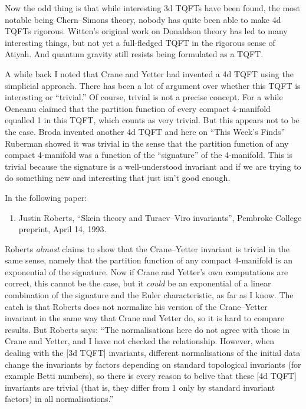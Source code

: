 \documentclass[12pt]{article}
\def\tightlist{}
\begin{document}
Now the odd thing is that while interesting 3d TQFTs have been found,
the most notable being Chern--Simons theory, nobody has quite been able
to make 4d TQFTs rigorous. Witten's original work on Donaldson theory
has led to many interesting things, but not yet a full-fledged TQFT in
the rigorous sense of Atiyah. And quantum gravity still resists being
formulated as a TQFT.

A while back I noted that Crane and Yetter had invented a 4d TQFT using
the simplicial approach. There has been a lot of argument over whether
this TQFT is interesting or ``trivial.'' Of course, trivial is not a
precise concept. For a while Ocneanu claimed that the partition function
of every compact 4-manifold equalled 1 in this TQFT, which counts as
very trivial. But this appears not to be the case. Broda invented
another 4d TQFT and here on ``This Week's Finds'' Ruberman showed it was
trivial in the sense that the partition function of any compact
4-manifold was a function of the ``signature'' of the 4-manifold. This
is trivial because the signature is a well-understood invariant and if
we are trying to do something new and interesting that just isn't good
enough.

In the following paper:

\begin{enumerate}
\def\labelenumi{\arabic{enumi})}
\tightlist
\item
   Justin Roberts, ``Skein theory and Turaev--Viro invariants'',
  Pembroke College preprint, April 14, 1993.
\end{enumerate}

Roberts \emph{almost} claims to show that the Crane--Yetter invariant is
trivial in the same sense, namely that the partition function of any
compact 4-manifold is an exponential of the signature. Now if Crane and
Yetter's own computations are correct, this cannot be the case, but it
\emph{could} be an exponential of a linear combination of the signature
and the Euler characteristic, as far as I know. The catch is that
Roberts does not normalize his version of the Crane--Yetter invariant in
the same way that Crane and Yetter do, so it is hard to compare results.
But Roberts says: ``The normalisations here do not agree with those in
Crane and Yetter, and I have not checked the relationship. However, when
dealing with the {[}3d TQFT{]} invariants, different normalisations of
the initial data change the invariants by factors depending on standard
topological invariants (for example Betti numbers), so there is every
reason to belive that these {[}4d TQFT{]} invariants are trivial (that
is, they differ from 1 only by standard invariant factors) in all
normalisations.''
\end{document}
